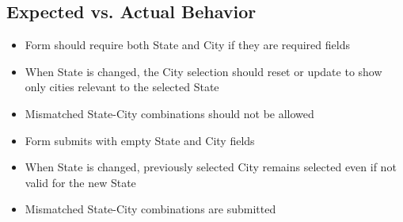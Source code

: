 \subsection*{Expected vs. Actual Behavior}
\begin{tcolorbox}[colback=gray!10, colframe=gray!40, title=Expected Behavior]
\begin{itemize}
    \item Form should require both State and City if they are required fields
    \item When State is changed, the City selection should reset or update to show only cities relevant to the selected State
    \item Mismatched State-City combinations should not be allowed
\end{itemize}
\end{tcolorbox}

\begin{tcolorbox}[colback=gray!10, colframe=gray!40, title=Actual Behavior]
\begin{itemize}
    \item Form submits with empty State and City fields
    \item When State is changed, previously selected City remains selected even if not valid for the new State
    \item Mismatched State-City combinations are submitted
\end{itemize}
\end{tcolorbox}

